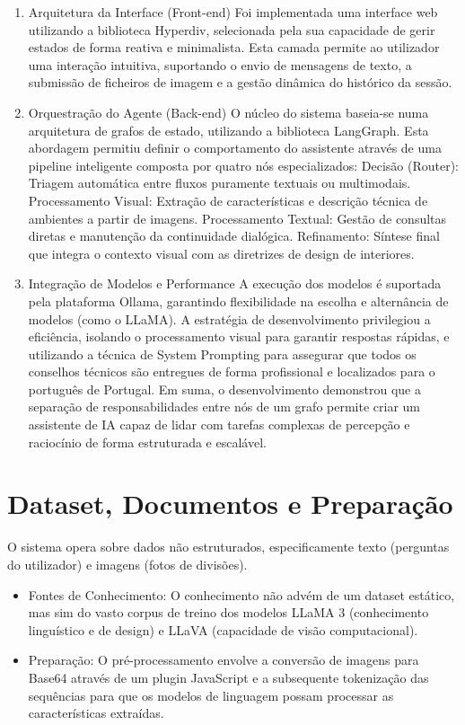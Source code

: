 \documentclass[a4paper,12pt]{scrreprt}
\begin{document}
    \begin{enumerate}
        \item Arquitetura da Interface (Front-end)
        Foi implementada uma interface web utilizando a biblioteca Hyperdiv, selecionada pela sua capacidade de gerir estados de forma reativa e minimalista. Esta camada permite ao utilizador uma interação intuitiva, suportando o envio de mensagens de texto, a submissão de ficheiros de imagem e a gestão dinâmica do histórico da sessão.
        \item Orquestração do Agente (Back-end)
        O núcleo do sistema baseia-se numa arquitetura de grafos de estado, utilizando a biblioteca LangGraph. Esta abordagem permitiu definir o comportamento do assistente através de uma pipeline inteligente composta por quatro nós especializados:
        Decisão (Router): Triagem automática entre fluxos puramente textuais ou multimodais.
        Processamento Visual: Extração de características e descrição técnica de ambientes a partir de imagens.
        Processamento Textual: Gestão de consultas diretas e manutenção da continuidade dialógica.
        Refinamento: Síntese final que integra o contexto visual com as diretrizes de design de interiores.
        \item Integração de Modelos e Performance
        A execução dos modelos é suportada pela plataforma Ollama, garantindo flexibilidade na escolha e alternância de modelos (como o LLaMA). A estratégia de desenvolvimento privilegiou a eficiência, isolando o processamento visual para garantir respostas rápidas, e utilizando a técnica de System Prompting para assegurar que todos os conselhos técnicos são entregues de forma profissional e localizados para o português de Portugal.
        Em suma, o desenvolvimento demonstrou que a separação de responsabilidades entre nós de um grafo permite criar um assistente de IA capaz de lidar com tarefas complexas de percepção e raciocínio de forma estruturada e escalável.
    \end{enumerate}
    \section{Dataset, Documentos e Preparação}
        O sistema opera sobre dados não estruturados, especificamente texto (perguntas do utilizador) e imagens (fotos de divisões).
        \begin{itemize}
            \item Fontes de Conhecimento: O conhecimento não advém de um dataset estático, mas sim do vasto corpus de treino dos modelos LLaMA 3 (conhecimento linguístico e de design) e LLaVA (capacidade de visão computacional).
            \item Preparação: O pré-processamento envolve a conversão de imagens para Base64 através de um plugin JavaScript e a subsequente tokenização das sequências para que os modelos de linguagem possam processar as características extraídas.
        \end{itemize}
\end{document}
